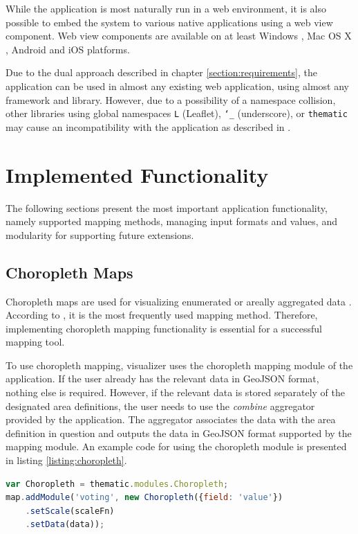 While the application is most naturally run in a web environment, it is also possible to embed the system to various native applications using a web view component. Web view components are available on at least Windows \citep{small_ten_2012}, Mac OS X \citep{hunter_why_2014}, Android \citep{google_building_2014} and iOS \citep{apple_uiwebview_2014} platforms.

Due to the dual approach described in chapter \ref{section:requirements}, the application can be used in almost any existing web application, using almost any framework and library. However, due to a possibility of a namespace collision, other libraries using global namespaces \texttt{L} (Leaflet), \texttt{\char`_} (underscore), or \texttt{thematic} may cause an incompatibility with the application as described in \citet{osmani_essential_2011}.

\section{Implemented Functionality}

The following sections present the most important application functionality, namely supported mapping methods, managing input formats and values, and modularity for supporting future extensions.

\subsection{Choropleth Maps}

Choropleth maps are used for visualizing enumerated or areally aggregated data \citep[chap.~6]{dent_cartography:_2008}. According to \citet[chap.~14]{slocum_thematic_2014}, it is the most frequently used mapping method. Therefore, implementing choropleth mapping functionality is essential for a successful mapping tool.

To use choropleth mapping, visualizer uses the choropleth mapping module of the application. If the user already has the relevant data in GeoJSON format, nothing else is required. However, if the relevant data is stored separately of the designated area definitions, the user needs to use the \emph{combine} aggregator provided by the application. The aggregator associates the data with the area definition in question and outputs the data in GeoJSON format supported by the mapping module. An example code for using the choropleth module is presented in listing \ref{listing:choropleth}.

\begin{lstlisting}[caption=Using the choropleth mapping module with Thematic.js.,language=JavaScript,label=listing:choropleth]
var Choropleth = thematic.modules.Choropleth;
map.addModule('voting', new Choropleth({field: 'value'})
    .setScale(scaleFn)
    .setData(data));
\end{lstlisting}

